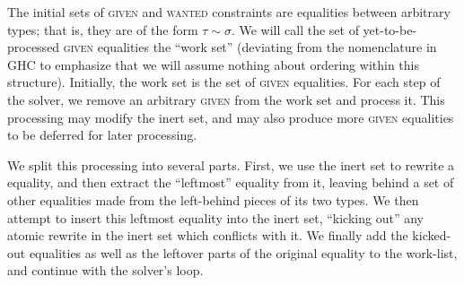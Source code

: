 \documentclass[10pt, letterpaper, oneside]{article}
\begin{document}
The initial sets of \textsc{given} and \textsc{wanted} constraints are equalities between arbitrary types; that is, they are of the form \(\tau \sim \sigma\). We will call the set of yet-to-be-processed \textsc{given} equalities the ``work set'' (deviating from the nomenclature in GHC to emphasize that we will assume nothing about ordering within this structure). Initially, the work set is the set of \textsc{given} equalities. For each step of the solver, we remove an arbitrary \textsc{given} from the work set and process it. This processing may modify the inert set, and may also produce more \textsc{given} equalities to be deferred for later processing.

We split this processing into several parts. First, we use the inert set to rewrite a  equality, and then extract the ``leftmost'' equality from it, leaving behind a set of other equalities made from the left-behind pieces of its two types. We then attempt to insert this leftmost equality into the inert set, ``kicking out'' any atomic rewrite in the inert set which conflicts with it. We finally add the kicked-out equalities as well as the leftover parts of the original  equality to the work-list, and continue with the solver's loop.
\end{document}
